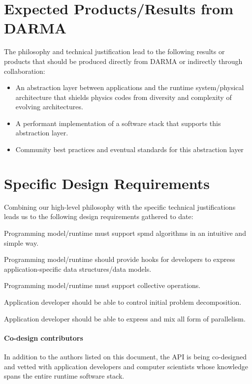 \section{Expected Products/Results from DARMA}
The philosophy and technical justification lead to the following results or products that should be produced directly from DARMA or indirectly through collaboration:
\begin{itemize}
\item An abstraction layer between applications and the
runtime system/physical architecture that shields physics codes from diversity and
complexity of evolving architectures.
\item A performant implementation of a software stack that supports this
abstraction layer.
\item Community best practices and eventual standards for this abstraction
layer
\end{itemize}

\section{Specific Design Requirements}
Combining our high-level philosophy with the specific technical justifications leads us to the following design requirements gathered to date:
\begin{compactitem}
\item Programming model/runtime must support \gls{spmd} algorithms in an intuitive and simple way.
\item Programming model/runtime should provide hooks for developers to express application-specific data structures/data models.
\item Programming model/runtime must support collective operations.
\item Application developer should be able to control initial problem decomposition.
\item Application developer should be able to express and mix all form of parallelism.
\end{compactitem}


\paragraph{Co-design contributors}
In addition to the authors listed on this document,
the \gls{API} is being \gls{co-design}ed and vetted with application developers
and computer scientists whose knowledge spans the entire runtime software stack.


